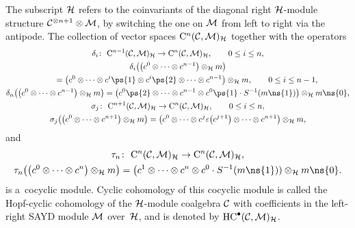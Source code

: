 {\sloppy The subscript ${\cal H}$ refers to the coinvariants of the diagonal right ${\cal H}$-module structure \mbox{${\cal C}^{\otimes
n+1}\otimes{\cal M}$}, by switching the one on ${\cal M}$ from left to right via the antipode.
The collection of vector spaces ${\rm C}^n({\cal C},{\cal M})_{{\cal H}}$ together with the operators
\begin{gather*}
\delta_i\colon \ {\rm C}^{n-1}({\cal C},{\cal M})_{{\cal H}} \to {\rm C}^n({\cal C},{\cal M})_{{\cal H}},
\qquad
0 \leq i \leq n,
\\
\delta_i\big(\big(c^0 \otimes \cdots \otimes c^{n-1}\big) \otimes_{{\cal H}} m\big) \\
\qquad{} =\big(c^0 \otimes \cdots \otimes c^i\ps{1} \otimes
c^i\ps{2} \otimes \cdots \otimes c^{n-1}\big) \otimes_{{\cal H}} m,
\qquad
0 \leq i \leq n-1,
\\
\delta_n\big(\big(c^0 \otimes \cdots \otimes c^{n-1}\big) \otimes_{{\cal H}} m\big) =\big(c^0\ps{2} \otimes \cdots \otimes c^{n-1}
\otimes c^0\ps{1} \cdot S^{-1}(m\ns{1})\big) \otimes_{{\cal H}} m\ns{0},
\\
\sigma_j\colon \ {\rm C}^{n+1}({\cal C},{\cal M})_{{\cal H}} \to {\rm C}^n({\cal C},{\cal M})_{{\cal H}},
\qquad
0 \leq i \leq n,
\\
\sigma_j\big(\big(c^0 \otimes \cdots \otimes c^{n+1}\big) \otimes_{{\cal H}} m\big) =\big(c^0 \otimes \cdots \otimes
c^{j}\varepsilon\big(c^{j+1}\big) \otimes \cdots \otimes c^{n+1}\big) \otimes_{{\cal H}} m,
\end{gather*}
and
\begin{gather*}
\tau_n\colon \ {\rm C}^{n}({\cal C},{\cal M})_{{\cal H}} \to {\rm C}^n({\cal C},{\cal M})_{{\cal H}},
\\
\tau_n\big(\big(c^0 \otimes \cdots \otimes c^n\big) \otimes_{\mathcal{H}} m\big) =\big(c^1 \otimes \cdots \otimes c^n \otimes c^0 \cdot
S^{-1}(m\ns{1})) \otimes_{\mathcal{H}} m\ns{0}.
\end{gather*}
is a~cocyclic module.
Cyclic cohomology of this cocyclic module is called the Hopf-cyclic cohomology of the ${\cal H}$-module coalgebra ${\cal
C}$ with coef\/f\/icients in the left-right SAYD module ${\cal M}$ over~${\cal H}$, and is denoted by ${\rm
HC}^\bullet({\cal C},{\cal M})_{\cal H}$.

}

